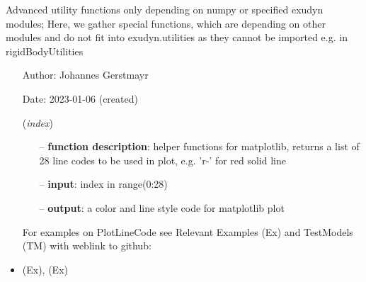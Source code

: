 
\label{sec:module:advancedUtilities}
  Advanced utility functions only depending on numpy or specified exudyn modules;
           Here, we gather special functions, which are depending on other modules and do not fit into exudyn.utilities as they cannot be imported e.g. in rigidBodyUtilities
\begin{itemize}[leftmargin=1.4cm]
\setlength{\itemindent}{-1.4cm}
\item[]Author:    Johannes Gerstmayr
\item[]Date:      2023-01-06 (created)
\ei
\begin{flushleft}
\label{sec:advancedUtilities:PlotLineCode}
({\it index})
\end{flushleft}
\setlength{\itemindent}{0.7cm}
\begin{itemize}[leftmargin=0.7cm]
\item[--]
{\bf function description}: helper functions for matplotlib, returns a list of 28 line codes to be used in plot, e.g. 'r-' for red solid line
\item[--]
{\bf input}: index in range(0:28)
\item[--]
{\bf output}: a color and line style code for matplotlib plot
\vspace{12pt}\end{itemize}
%
%
\noindent For examples on PlotLineCode see Relevant Examples (Ex) and TestModels (TM) with weblink to github:
\bi
 \item \footnotesize {} (Ex), 
 (Ex)
\ei


\end{itemize}
